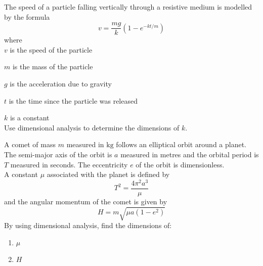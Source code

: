 \documentclass[leqno]{article}
\begin{document}
\begin{enumerate}[
  label=\textbf{\arabic*.},
  leftmargin=*,
  topsep=0pt,
  partopsep=0pt,
  parsep=0pt
]
\questionitem

The speed of a particle falling vertically through a resistive medium is modelled by the formula
\[
v=\dfrac{mg}{k}\left(1-e^{-kt/m}\right)
\] 
where \\

$v$ is the speed of the particle

$m$ is the mass of the particle

$g$ is the acceleration due to gravity

$t$ is the time since the particle was released

$k$ is a constant \\

Use dimensional analysis to determine the dimensions of $k$.  \\

\newpage

\questionitem

A comet of mass $m$ measured in $\mathrm{kg}$ follows an elliptical orbit around a planet. The semi-major axis of the orbit is $a$ measured in metres and the orbital period is $T$ measured in seconds. The eccentricity $e$ of the orbit is dimensionless. \\

A constant $\mu$ associated with the planet is defined by
\[
T^2 = \frac{4\pi^2 a^3}{\mu}
\]
and the angular momentum of the comet is given by
\[
H = m\sqrt{\mu a(1-e^2)}
\]
By using dimensional analysis, find the dimensions of:

\begin{enumerate}[label=\textbf{(\alph*)}]
  \item $\mu$ 
  \item $H$ 
\end{enumerate}

\newpage

\questionitem


\end{enumerate}
\end{document}
